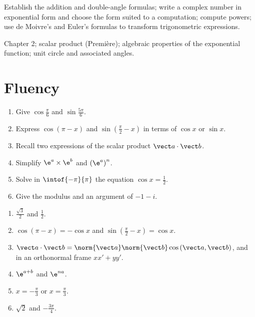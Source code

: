 
\begin{objectives}
Establish the addition and double-angle formulas; write a complex number in exponential form and choose the form suited to a computation; compute powers; use de Moivre's and Euler's formulas to transform trigonometric expressions.
\end{objectives}
\begin{prerequisites}
Chapter 2; scalar product (Première); algebraic properties of the exponential function; unit circle and associated angles.
\end{prerequisites}

\section{Fluency}
\begin{fluency}
\begin{enumerate}
\item Give $\cos\frac\pi6$ and $\sin\frac{5\pi}6$.
\item Express $\cos(\pi-x)$ and $\sin\left(\frac\pi2-x\right)$ in terms of $\cos x$ or $\sin x$.
\item Recall two expressions of the scalar product $\vect a\cdot\vect b$.
\item Simplify $\e^{a}\times\e^{b}$ and $\left(\e^{a}\right)^n$.
\item Solve in $\intof{-\pi}{\pi}$ the equation $\cos x=\frac12$.
\item Give the modulus and an argument of $-1-i$.
\end{enumerate}
\end{fluency}
\begin{solution}[Fluency]
\begin{enumerate}
\item $\frac{\sqrt3}2$ and $\frac12$.
\item $\cos(\pi-x)=-\cos x$ and $\sin\left(\frac\pi2-x\right)=\cos x$.
\item $\vect a\cdot\vect b=\norm{\vect a}\norm{\vect b}\cos\left(\vect a,\vect b\right)$, and in an orthonormal frame $xx'+yy'$.
\item $\e^{a+b}$ and $\e^{na}$.
\item $x=-\frac\pi3$ or $x=\frac\pi3$.
\item $\sqrt2$ and $-\frac{3\pi}4$.
\end{enumerate}
\end{solution}

